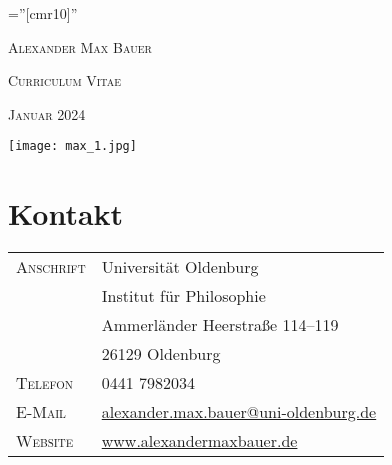 \documentclass[a4paper,10pt]{article}
\begin{document}
\pagestyle{empty}
\font\fb=''[cmr10]''

\par{\centering
   {\Huge\textsc{Alexander Max Bauer}
   }\bigskip\par}

\par{\centering
   {\Large\textsc{Curriculum Vitae}
   }\bigskip\par}

\par{\centering
   {\Large\textsc{Januar 2024}
   }\bigskip\par}

\vspace{2cm}
\begin{center}
   \texttt{[image: max\_1.jpg]}
\end{center}


\vspace{2cm}
\section{Kontakt}
\begin{longtable}{p{}p{}}
   \textsc{Anschrift}   & Universität Oldenburg\\
                        & Institut für Philosophie\\
                        & Ammerländer Heerstraße 114--119\\
                        & 26129 Oldenburg\\
   \textsc{Telefon}     & 0441 7982034\\
   \textsc{E-Mail}      & \href{mailto:alexander.max.bauer@uni-oldenburg.de}{alexander.max.bauer@uni-oldenburg.de}\\
   \textsc{Website}     & \href{http://www.alexandermaxbauer.de/}{www.alexandermaxbauer.de}
\end{longtable}


\clearpage
\end{document}
